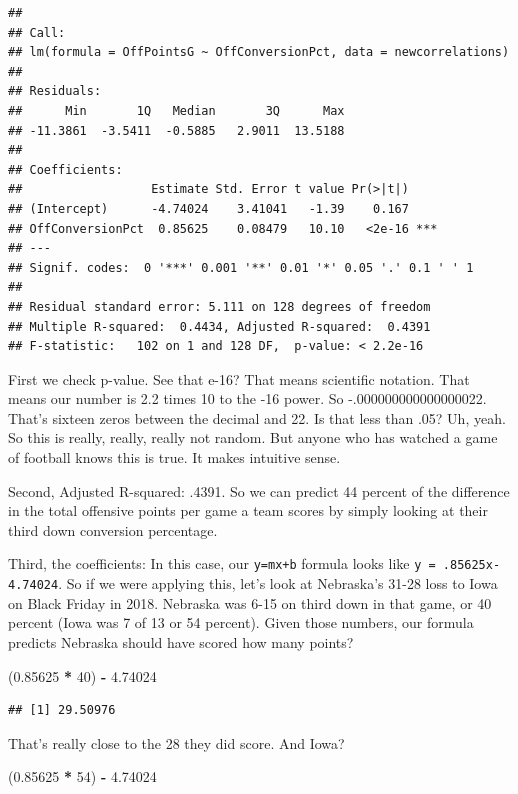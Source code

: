 \documentclass[]{book}
\newenvironment{Shaded}{\begin{snugshade}}{\end{snugshade}}
\newcommand{\DecValTok}[1]{\textcolor[rgb]{0.00,0.00,0.81}{#1}}
\newcommand{\FloatTok}[1]{\textcolor[rgb]{0.00,0.00,0.81}{#1}}
\newcommand{\NormalTok}[1]{#1}
\newcommand{\OperatorTok}[1]{\textcolor[rgb]{0.81,0.36,0.00}{\textbf{#1}}}
\newcommand{\StringTok}[1]{\textcolor[rgb]{0.31,0.60,0.02}{#1}}
\begin{document}
\begin{verbatim}
## 
## Call:
## lm(formula = OffPointsG ~ OffConversionPct, data = newcorrelations)
## 
## Residuals:
##      Min       1Q   Median       3Q      Max 
## -11.3861  -3.5411  -0.5885   2.9011  13.5188 
## 
## Coefficients:
##                  Estimate Std. Error t value Pr(>|t|)    
## (Intercept)      -4.74024    3.41041   -1.39    0.167    
## OffConversionPct  0.85625    0.08479   10.10   <2e-16 ***
## ---
## Signif. codes:  0 '***' 0.001 '**' 0.01 '*' 0.05 '.' 0.1 ' ' 1
## 
## Residual standard error: 5.111 on 128 degrees of freedom
## Multiple R-squared:  0.4434, Adjusted R-squared:  0.4391 
## F-statistic:   102 on 1 and 128 DF,  p-value: < 2.2e-16
\end{verbatim}

First we check p-value. See that e-16? That means scientific notation. That means our number is 2.2 times 10 to the -16 power. So -.000000000000000022. That's sixteen zeros between the decimal and 22. Is that less than .05? Uh, yeah. So this is really, really, really not random. But anyone who has watched a game of football knows this is true. It makes intuitive sense.

Second, Adjusted R-squared: .4391. So we can predict 44 percent of the difference in the total offensive points per game a team scores by simply looking at their third down conversion percentage.

Third, the coefficients: In this case, our \texttt{y=mx+b} formula looks like \texttt{y\ =\ .85625x-4.74024}. So if we were applying this, let's look at Nebraska's 31-28 loss to Iowa on Black Friday in 2018. Nebraska was 6-15 on third down in that game, or 40 percent (Iowa was 7 of 13 or 54 percent). Given those numbers, our formula predicts Nebraska should have scored how many points?

\begin{Shaded}
\begin{Highlighting}[]
\NormalTok{(}\FloatTok{0.85625} \OperatorTok{*}\StringTok{ }\DecValTok{40}\NormalTok{) }\OperatorTok{-}\StringTok{ }\FloatTok{4.74024} 
\end{Highlighting}
\end{Shaded}

\begin{verbatim}
## [1] 29.50976
\end{verbatim}

That's really close to the 28 they did score. And Iowa?

\begin{Shaded}
\begin{Highlighting}[]
\NormalTok{(}\FloatTok{0.85625} \OperatorTok{*}\StringTok{ }\DecValTok{54}\NormalTok{) }\OperatorTok{-}\StringTok{ }\FloatTok{4.74024} 
\end{Highlighting}
\end{Shaded}
\end{document}
